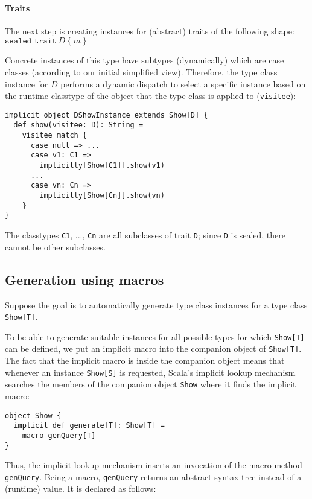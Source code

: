 \documentclass[preprint]{sigplanconf}
\begin{document}
\paragraph{Traits} The next step is creating instances for (abstract) traits of the following
shape:
\begin{math}
\texttt{sealed trait}~D~\{~\bar{m}~\}
\end{math}

Concrete instances of this type have subtypes (dynamically) which are case
classes (according to our initial simplified view). Therefore, the type class
instance for $D$ performs a dynamic dispatch to select a specific instance
based on the runtime classtype of the object that the type class is applied
to (\verb|visitee|):

\begin{lstlisting}
implicit object DShowInstance extends Show[D] {
  def show(visitee: D): String =
    visitee match {
      case null => ...
      case v1: C1 =>
        implicitly[Show[C1]].show(v1)
      ...
      case vn: Cn =>
        implicitly[Show[Cn]].show(vn)
    }
}
\end{lstlisting}
\noindent
The classtypes \verb|C1|, ..., \verb|Cn| are all subclasses of trait \verb|D|;
since \verb|D| is sealed, there cannot be other subclasses.



\subsection{Generation using macros}
Suppose the goal is to automatically generate type class instances for a type class \verb|Show[T]|.

To be able to generate suitable instances for all possible types for which \verb|Show[T]| can be defined, we put an implicit macro into the companion object of \verb|Show[T]|. The fact that the implicit macro is inside the companion object means that whenever an instance \verb|Show[S]| is requested, Scala's implicit lookup mechanism searches the members of the companion object \verb|Show| where it finds the implicit macro:

\begin{lstlisting}
object Show {
  implicit def generate[T]: Show[T] =
    macro genQuery[T]
}
\end{lstlisting}
\noindent
Thus, the implicit lookup mechanism inserts an invocation of the macro method
\verb|genQuery|. Being a macro, \verb|genQuery| returns an abstract syntax
tree instead of a (runtime) value. It is declared as follows:
\end{document}
